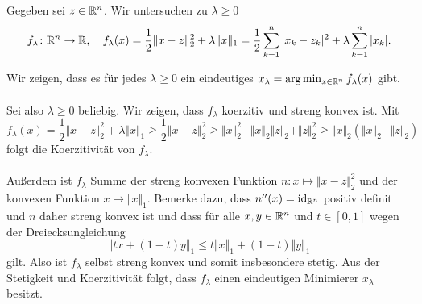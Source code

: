 
Gegeben sei $z\in\mathbb{R}^n$. Wir untersuchen zu $\lambda\geq 0$
\begin{displaymath}
 f_\lambda\colon \mathbb{R}^n\to\mathbb{R},\quad f_\lambda(x)=\frac{1}{2}\Vert x-z\Vert_2^2+\lambda\Vert x\Vert_1=\frac{1}{2}\sum_{k=1}^n |x_k-z_k|^2+\lambda\sum_{k=1}^n|x_k|.
\end{displaymath}
\begin{compactenum}[(i)]
 \item Wir zeigen, dass es für jedes $\lambda\geq 0$ ein eindeutiges $x_\lambda = \arg\min_{x\in\mathbb{R}^n}f_\lambda(x)$ gibt.\\\\
Sei also $\lambda\geq 0$ beliebig.
 Wir zeigen, dass $f_\lambda$ koerzitiv und streng konvex ist. Mit
 \begin{displaymath}
  f_\lambda(x)=\frac{1}{2}\Vert x-z\Vert_2^2+\lambda\Vert x\Vert_1\geq \frac{1}{2}\Vert x-z\Vert_2^2\geq \Vert x\Vert_2^2-\Vert x\Vert_2\Vert z\Vert_2+\Vert z \Vert_2^2\geq \Vert x\Vert_2(\Vert x\Vert_2-\Vert z\Vert_2)
 \end{displaymath}
 folgt die Koerzitivität von $f_\lambda$.\\\\
Außerdem ist $f_\lambda$ Summe der streng konvexen Funktion $n: x\mapsto \Vert x-z\Vert_2^2$ und der konvexen Funktion $x\mapsto \Vert x\Vert_1$. Bemerke dazu, dass $n''(x)=\operatorname{id}_{\mathbb{R}^n}$ positiv definit und $n$ daher streng konvex ist und dass für alle $x,y\in\mathbb{R}^n$ und $t\in [0,1]$
wegen der Dreiecksungleichung
 \begin{displaymath}
  \Vert tx+(1-t)y\Vert_1\leq t\Vert x\Vert_1+(1-t)\Vert y\Vert_1
 \end{displaymath}
gilt. Also ist $f_\lambda$ selbst streng konvex und somit insbesondere stetig. Aus der Stetigkeit und Koerzitivität folgt, dass $f_\lambda$ einen eindeutigen Minimierer $x_\lambda$ besitzt.
 \\
 \item


\end{compactenum}

